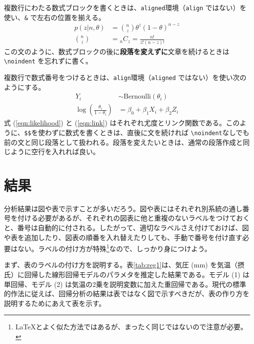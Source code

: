 \documentclass[lualatex,
               a4paper,
               10.5pt,
               ja=standard,
               jafont=ipaex]{bxjsarticle}
\begin{document}
複数行にわたる数式ブロックを書くときは、\texttt{aligned}環境（\texttt{align} ではない）を使い、\texttt{\&} で左右の位置を揃える。
\[
\begin{aligned}
  p(z | n, \theta) &= \binom{n}{z} \theta^{z} (1 - \theta)^{n - z}\\
  \binom{n}{z} &= {}_n C_z = \frac{n!}{z! (n - z)!}
\end{aligned}
\]
\noindent この文のように、数式ブロックの後に\textbf{段落を変えずに}文章を続けるときは \texttt{\textbackslash{}noindent} を忘れずに書く。

複数行で数式番号をつけるときは、\texttt{align}環境（\texttt{aligned} ではない）を使い次のようにする。
\begin{align}
  Y_i &\sim \mbox{Bernoulli}(\theta_i)  \label{eqn:likelihood} \\
  \log \left( \frac{\theta_i}{1 - \theta_i} \right) &=  \beta_0 + \beta_1 X_{i} + \beta_2 Z_{i} \label{eqn:link}
\end{align}
式 (\ref{eqn:likelihood}) と (\ref{eqn:link}) はそれぞれ尤度とリンク関数である。このように、\texttt{\$\$}を使わずに数式を書くときは、直後に文を続ければ \texttt{\textbackslash{}noindent}なしでも前の文と同じ段落として扱われる。段落を変えたいときは、通常の段落作成と同じように空行を入れれば良い。

\section{結果}\label{ux7d50ux679c}

分析結果は図や表で示すことが多いだろう。図や表にはそれぞれ別系統の通し番号を付ける必要があるが、それぞれの図表に他と重複のないラベルをつけておくと、番号は自動的に付される。したがって、適切なラベルさえ付けておけば、図や表を追加したり、図表の順番を入れ替えたりしても、手動で番号を付け直す必要はない。ラベルの付け方が特殊\footnote{\LaTeX  とよく似た方法ではあるが、まったく同じではないので注意が必要。}なので、しっかり身につけよう。

まず、表のラベルの付け方を説明する。表\ref{tab:reg1}は、気圧 (mm) を気温（摂氏）に回帰した線形回帰モデルのパラメタを推定した結果である。モデル (1) は単回帰、モデル (2) は気温の2乗を説明変数に加えた重回帰である。現代の標準的作法に従えば、回帰分析の結果は表ではなく図で示すべきだが、表の作り方を説明するためにあえて表を示す。
\end{document}
